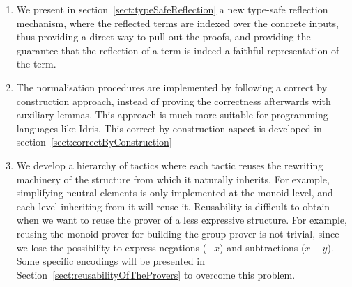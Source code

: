 \begin{enumerate}

\item We present in section~\ref{sect:typeSafeReflection} a new type-safe reflection mechanism, where the reflected terms are indexed over the concrete inputs, thus providing a direct way to pull out the proofs, and providing the guarantee that the reflection of a term is indeed a faithful representation of the term.

\item The normalisation procedures are implemented by following a correct by construction approach, instead of proving the correctness afterwards with auxiliary lemmas. This approach is much more suitable for programming languages like Idris. This correct-by-construction aspect is developed in section~\ref{sect:correctByConstruction}

\item We develop a hierarchy of tactics where each tactic reuses the
rewriting machinery of the structure from which it naturally inherits.
For example, simplifying neutral elements is only implemented at the monoid level, and each level inheriting from it will reuse it. Reusability is difficult to obtain when we want to reuse the prover of a less expressive structure. For example, reusing the monoid prover for building the
group prover is not trivial, since we lose the possibility to express
negations ($-x$) and subtractions ($x-y$). Some specific encodings
will be presented in Section~\ref{sect:reusabilityOfTheProvers} to overcome this problem.

\end{enumerate}


